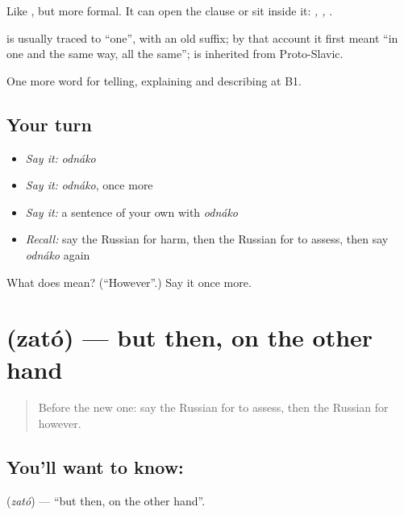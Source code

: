 Like \emph{}, but more formal. It can open the clause or sit inside it: \emph{, ,  }.

\begin{cousinweb}
\textbf{} is usually traced to \emph{} \textquotedblleft{}one\textquotedblright{}, with an old suffix; by that account it first meant \textquotedblleft{}in one and the same way, all the same\textquotedblright{}; \emph{} is inherited from Proto-Slavic.
\end{cousinweb}

\begin{grammarlens}[title={What you've built}]
One more word for telling, explaining and describing at B1.
\end{grammarlens}

\subsection*{Your turn}
\begin{itemize}
\raggedright
  \item \emph{Say it:} \emph{odnáko}
  \item \emph{Say it:} \emph{odnáko}, once more
  \item \emph{Say it:} a sentence of your own with \emph{odnáko}
  \item \emph{Recall:} say the Russian for harm, then the Russian for to assess, then say \emph{odnáko} again
\end{itemize}

\begin{tcolorbox}[breakable,colback=teal!4,colframe=teal!35!black,title={Before you move on}]
What does  mean? (\textquotedblleft{}However\textquotedblright{}.) Say it once more.
\end{tcolorbox}
\section[\texorpdfstring{\ru{зато} (zató)}{зато (zató)}]{ (zató) — but then, on the other hand}

\label{lesson:RU-C347-zato}



\begin{quote}
Before the new one: say the Russian for to assess, then the Russian for however.
\end{quote}

\subsection*{You'll want to know: }
\textbf{} (\emph{zató}) — \textquotedblleft{}but then, on the other hand\textquotedblright{}.

